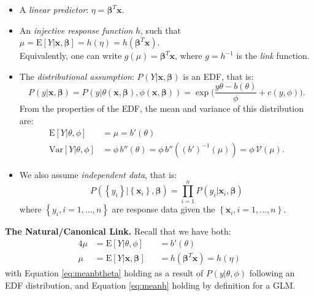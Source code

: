 \documentclass[
  12pt,
]{book}
\begin{document}
\begin{itemize}
\item
  A \emph{linear predictor}: \(\eta = \boldsymbol{\beta}^{T}\boldsymbol{x}\).
\item
  An \emph{injective response function} \(h\), such that \(\mu = {\mathrm E}[Y |\boldsymbol{x}, \boldsymbol{\beta}] = h(\eta) = h(\boldsymbol{\beta}^{T}\boldsymbol{x})\).\\
  Equivalently, one can write \(g(\mu) = \boldsymbol{\beta}^{T}\boldsymbol{x}\), where \(g = h^{-1}\) is the \emph{link} function.
\item
  The \emph{distributional assumption}: \(P_{}\left(Y |\boldsymbol{x}, \boldsymbol{\beta}\right)\) is an EDF, that is:
  \begin{equation}
        P_{}\left(y |\boldsymbol{x}, \boldsymbol{\beta}\right)
        =
        P_{}\left(y |\theta(\boldsymbol{x}, \boldsymbol{\beta}), \phi(\boldsymbol{x}, \boldsymbol{\beta})\right)
        = \exp
        \Big(
            \frac{y\theta - b(\theta)}{\phi} + c(y, \phi)
        \Big).
    \end{equation}
  From the properties of the EDF, the mean and variance of this distribution are:
  \begin{align}
    {\mathrm E}[Y |\theta, \phi] &= \mu = b'(\theta) 
    \\
    {\mathrm{Var}}[Y |\theta, \phi] &= \phi \, b''(\theta) = \phi \, b''((b')^{-1}(\mu)) = \phi \, \mathcal{V}(\mu).
  \end{align}
\item
  We also assume \emph{independent data}, that is:
  \begin{equation}
        P_{}\left(\left\{y_{i}\right\} |\left\{\boldsymbol{x}_{i}\right\}, \boldsymbol{\beta}\right)
        =
        \prod_{i=1}^n
        P_{}\left(y_{i} |\boldsymbol{x}_{i}, \boldsymbol{\beta}\right)
    \end{equation}
  where \(\left\{y_{i}, i = 1,...,n\right\}\) are response data given the \(\left\{\boldsymbol{x}_i, i = 1,...,n\right\}\).
\end{itemize}

\textbf{The Natural/Canonical Link.} Recall that we have both:
\begin{alignat}{4}
\mu & =  {\mathrm E}[Y |\theta, \phi] && =  b'(\theta) 
\label{eq:meanbtheta}
\\
\mu & =  {\mathrm E}[Y |\boldsymbol{x}, \boldsymbol{\beta}] && =  h(\boldsymbol{\beta}^T\boldsymbol{x})  =  h(\eta)
\label{eq:meanh}
\end{alignat}
with Equation \eqref{eq:meanbtheta} holding as a result of
\(P_{}\left(y |\theta, \phi\right)\)
following an EDF distribution, and Equation \eqref{eq:meanh} holding by definition for a GLM.
\end{document}
